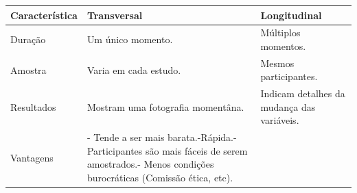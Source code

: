 \documentclass[
]{book}
\begin{document}
\begin{longtable}[]{@{}lll@{}}
\toprule
\begin{minipage}[b]{0.31\columnwidth}\raggedright
Característica\strut
\end{minipage} & \begin{minipage}[b]{0.29\columnwidth}\raggedright
Transversal\strut
\end{minipage} & \begin{minipage}[b]{0.31\columnwidth}\raggedright
Longitudinal\strut
\end{minipage}\tabularnewline
\midrule
\endhead
\begin{minipage}[t]{0.31\columnwidth}\raggedright
Duração\strut
\end{minipage} & \begin{minipage}[t]{0.29\columnwidth}\raggedright
Um único momento.\strut
\end{minipage} & \begin{minipage}[t]{0.31\columnwidth}\raggedright
Múltiplos momentos.\strut
\end{minipage}\tabularnewline
\begin{minipage}[t]{0.31\columnwidth}\raggedright
Amostra\strut
\end{minipage} & \begin{minipage}[t]{0.29\columnwidth}\raggedright
Varia em cada estudo.\strut
\end{minipage} & \begin{minipage}[t]{0.31\columnwidth}\raggedright
Mesmos participantes.\strut
\end{minipage}\tabularnewline
\begin{minipage}[t]{0.31\columnwidth}\raggedright
Resultados\strut
\end{minipage} & \begin{minipage}[t]{0.29\columnwidth}\raggedright
Mostram uma fotografia momentâna.\strut
\end{minipage} & \begin{minipage}[t]{0.31\columnwidth}\raggedright
Indicam detalhes da mudança das variáveis.\strut
\end{minipage}\tabularnewline
\begin{minipage}[t]{0.31\columnwidth}\raggedright
Vantagens\strut
\end{minipage} & \begin{minipage}[t]{0.29\columnwidth}\raggedright
- Tende a ser mais barata.-Rápida.-Participantes são mais fáceis de serem amostrados.- Menos condições burocráticas (Comissão ética, etc).\strut

\end{minipage}
\end{longtable}
\end{document}

